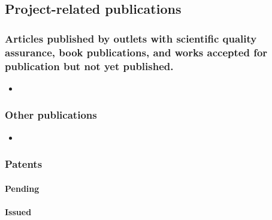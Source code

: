 \subsection{Project-related publications}


\subsubsection{Articles published by outlets with scientific quality assurance, book publications, and works accepted for publication but not yet published.}
		

		
		\begin{itemize}
		\item 
		\end{itemize}

\subsubsection{Other publications}


\begin{itemize}
\item 
\end{itemize}


\subsubsection{Patents}

	\paragraph{Pending}

	\paragraph{Issued}
